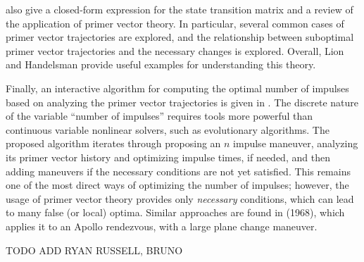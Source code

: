  also give a closed-form expression for the state transition matrix and a review of the application of primer vector theory. In particular, several common cases of primer vector trajectories are explored, and the relationship between suboptimal primer vector trajectories and the necessary changes is explored. Overall, Lion and Handelsman provide useful examples for understanding this theory. 

Finally, an interactive algorithm for computing the optimal number of impulses based on analyzing the primer vector trajectories is given in . The discrete nature of the variable ``number of impulses'' requires tools more powerful than continuous variable nonlinear solvers, such as evolutionary algorithms. The proposed algorithm iterates through proposing an \(n\) impulse maneuver, analyzing its primer vector history and optimizing impulse times, if needed, and then adding maneuvers if the necessary conditions are not yet satisfied. This remains one of the most direct ways of optimizing the number of impulses; however, the usage of primer vector theory provides only \textit{necessary} conditions, which can lead to many false (or local) optima. Similar approaches are found in  (1968), which applies it to an Apollo rendezvous, with a large plane change maneuver.

TODO ADD RYAN RUSSELL, BRUNO

